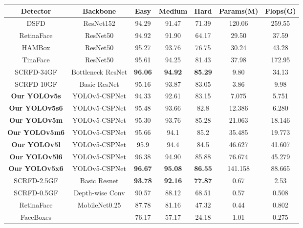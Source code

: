 \documentclass[conference]{IEEEtran}
\begin{document}
\begin{table*}[!htb]
    \centering
    \begin{tabular}{c|c|c|c|c|c|c}
        \hline
        Detector & Backbone & Easy & Medium &  Hard & Params(M) & Flops(G)  \\
        \hline
       DSFD \cite{DSFD} & ResNet152 \cite{Resnet} & 94.29  & 91.47 &  71.39 &  120.06  & 259.55 \\
       RetinaFace \cite{RetinaFace}  & ResNet50 \cite{Resnet}  & 94.92 &  91.90 &  64.17 &  29.50 &  37.59\\
       HAMBox \cite{HAMBox}  &  ResNet50 \cite{Resnet} &  95.27 &  93.76 &  76.75 &  30.24 &  43.28\\
       TinaFace \cite{TinaFace} &  ResNet50 \cite{Resnet}  & 95.61 &  94.25 &  81.43 &  37.98 &  172.95\\
       SCRFD-34GF \cite{SCRFD} &  Bottleneck ResNet  & \textbf{96.06} &  \textbf{94.92} &  \textbf{85.29} &  9.80 &  34.13\\
       SCRFD-10GF \cite{SCRFD} &  Basic ResNet \cite{Resnet} &  95.16  & 93.87 &  83.05 &  3.86 &  9.98\\
       
       \textbf{Our YOLOv5s} & YOLOv5-CSPNet \cite{YOLOv5} &94.33 & 92.61 & 83.15 & 7.075 & 5.751 \\
       \textbf{Our YOLOv5s6} & YOLOv5-CSPNet & 95.48 & 93.66 & 82.8 & 12.386 & 6.280 \\
       \textbf{Our YOLOv5m} & YOLOv5-CSPNet & 95.30 & 93.76 & 85.28 & 21.063 & 18.146 \\
       \textbf{Our YOLOv5m6} & YOLOv5-CSPNet & 95.66 & 94.1 & 85.2 & 35.485 & 19.773 \\
       \textbf{Our YOLOv5l} & YOLOv5-CSPNet & 95.9 & 94.4 & 84.5 & 46.627 & 41.607 \\
       \textbf{Our YOLOv5l6} & YOLOv5-CSPNet & 96.38 & 94.90 & 85.88 & 76.674 & 45.279 \\
\textbf{Our YOLOv5x6} & YOLOv5-CSPNet & \textbf{96.67} & \textbf{95.08} & \textbf{86.55} & 141.158 & 88.665 \\
       
       \hline
       SCRFD-2.5GF \cite{SCRFD} &  Basic Resnet  & \textbf{93.78} &  \textbf{92.16} &  \textbf{77.87} &  0.67 &  2.53\\ 
       SCRFD-0.5GF \cite{SCRFD}	&Depth-wise Conv& 90.57&88.12&	68.51&	0.57	&0.508 \\
       RetinaFace \cite{RetinaFace} &	MobileNet0.25\cite{MobileNetV2}	&87.78	&81.16&	47.32&	0.44&	0.802\\
       FaceBoxes \cite{FaceBox} &	- &	76.17&	57.17&	24.18&	1.01&	0.275\\
       

\end{tabular}
\end{table*}
\end{document}
